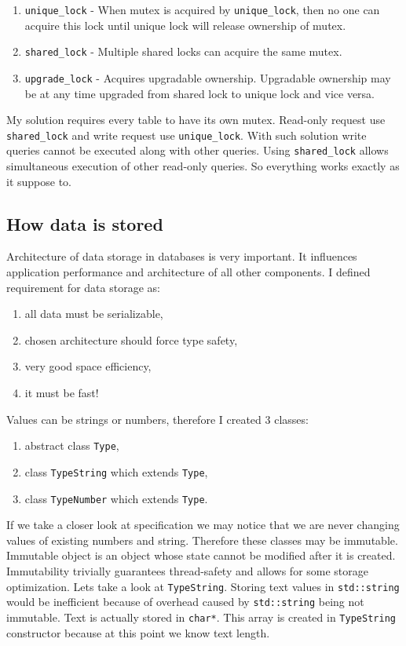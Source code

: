 \documentclass[10pt,a4paper]{article}
\begin{document}
\begin{enumerate}
\item \verb|unique_lock| - When mutex is acquired by \verb|unique_lock|, then no one can acquire this lock until unique lock will release ownership of mutex. 
\item \verb|shared_lock| - Multiple shared locks can acquire the same mutex.
\item \verb|upgrade_lock| - Acquires upgradable ownership. Upgradable ownership may be at any time upgraded from shared lock to unique lock and vice versa.
\end{enumerate}

My solution requires every table to have its own mutex. Read-only request use \verb|shared_lock| and write request use \verb|unique_lock|. With such solution write queries cannot be executed along with other queries. Using \verb|shared_lock| allows simultaneous execution of other read-only queries. So everything works exactly as it suppose to.

\subsection{How data is stored}

Architecture of data storage in databases is very important. It influences application performance and architecture of all other components. I defined requirement for data storage as: 
\begin{enumerate}
\item all data must be serializable,
\item chosen architecture should force type safety,
\item very good space efficiency,
\item it must be fast!
\end{enumerate}
Values can be strings or numbers, therefore I created 3 classes:
\begin{enumerate}
\item abstract class \verb|Type|,
\item class \verb|TypeString| which extends \verb|Type|,
\item class \verb|TypeNumber| which extends \verb|Type|.
\end{enumerate}

If we take a closer look at specification we may notice that we are never changing values of existing numbers and string. Therefore these classes may be immutable. Immutable object is an object whose state cannot be modified after it is created. Immutability trivially guarantees thread-safety and allows for some storage optimization. Lets take a look at \verb|TypeString|. Storing text values in \verb|std::string| would be inefficient because of overhead caused by \verb|std::string| being not immutable. Text is actually stored in \verb|char*|. This array is created in \verb|TypeString| constructor because at this point we know text length.   
\end{document}
